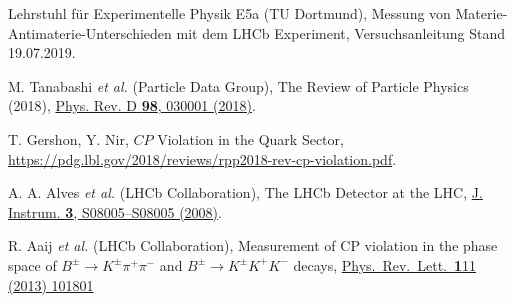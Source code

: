 \begin{thebibliography}{99}
  Lehrstuhl für Experimentelle Physik E5a (TU Dortmund),
  Messung von Materie-Antimaterie-Unterschieden mit dem LHCb Experiment,
  Versuchsanleitung Stand 19.07.2019.

  M. Tanabashi \textit{et al.} (Particle Data Group),
  The Review of Particle Physics (2018),
  \href{https://journals.aps.org/prd/abstract/10.1103/PhysRevD.98.030001}
  {Phys. Rev. D \textbf{98}, 030001 (2018)}.

  T. Gershon, Y. Nir,
  $CP$ Violation in the Quark Sector,
  \url{https://pdg.lbl.gov/2018/reviews/rpp2018-rev-cp-violation.pdf}.

  A. A. Alves \textit{et al.} (LHCb Collaboration),
  The LHCb Detector at the LHC,
  \href{https://doi.org/10.1088%2F1748-0221%2F3%2F08%2Fs08005}
  {J. Instrum. \textbf{3}, S08005--S08005 (2008)}.

  R. Aaij \textit{et al.} (LHCb Collaboration),
  Measurement of CP violation in the phase space of $B^{\pm} \to K^{\pm} \pi^{+} \pi^{-}$ and $B^{\pm} \to K^{\pm} K^{+} K^{-}$ decays,
  \href{  %%CITATION = doi:10.1103/PhysRevLett.111.101801;%%}
  {Phys.\ Rev.\ Lett.\  {\textbf 111} (2013) 101801}

\end{thebibliography}
